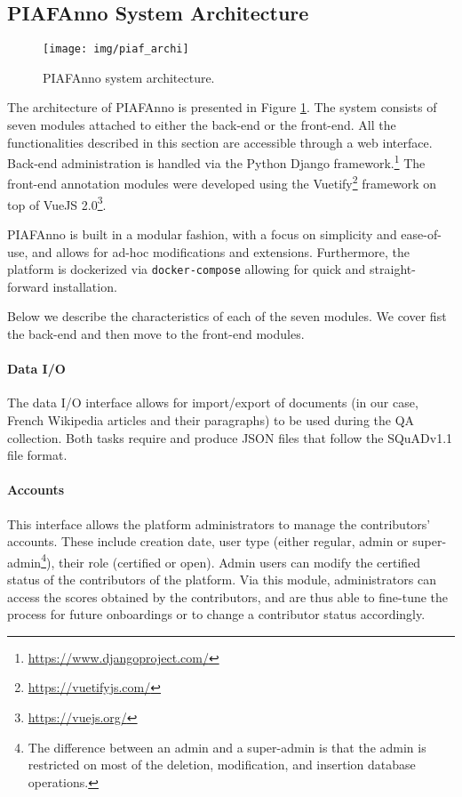 \documentclass[10pt, a4paper]{article}
\begin{document}
\subsection{PIAFAnno System Architecture}

\begin{figure}[h!]
	\centering
	\texttt{[image: img/piaf\_archi]}
	\caption{PIAFAnno system architecture.}
	\label{fig:piafarchi}
\end{figure}

The architecture of PIAFAnno is presented in Figure \ref{fig:piafarchi}. The system consists of seven modules attached to either the back-end or the front-end. All the functionalities described in this section are accessible through a web interface. Back-end administration is handled via the Python Django framework.\footnote{\url{https://www.djangoproject.com/}} The front-end annotation modules were developed using the Vuetify\footnote{\url{https://vuetifyjs.com/}} framework on top of VueJS 2.0\footnote{\url{https://vuejs.org/}}.

PIAFAnno is built in a modular fashion, with a focus on simplicity and ease-of-use, and allows for ad-hoc modifications and extensions. Furthermore, the platform is dockerized via \texttt{docker-compose} allowing for quick and straight-forward installation. 

Below we describe the characteristics of each of the seven modules. We cover fist the back-end and then move to the front-end modules.

\paragraph{Data I/O}

The data I/O interface allows for import/export of documents (in our case, French Wikipedia articles and their paragraphs) to be used during the QA collection. Both tasks require and produce JSON files that follow the SQuADv1.1 file format.

\paragraph{Accounts}

This interface allows the platform administrators to manage the contributors' accounts. These include creation date, user type (either regular, admin or super-admin\footnote{The difference between an admin and a super-admin is that the admin is restricted on most of the deletion, modification, and insertion database operations.}), their role (certified or open). Admin users can modify the certified status of the contributors of the platform. Via this module, administrators can access the scores obtained by the contributors, and are thus able to fine-tune the process for future onboardings or to change a contributor status accordingly.
\end{document}
